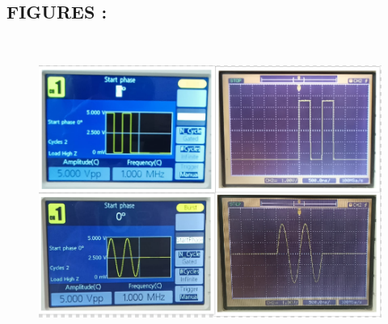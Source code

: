 \documentclass[report]{IEEEtran}
\begin{document}
\subsection{FIGURES : } \\

\begin{figure}[h]
				 \centering
				 \includegraphics[width=\columnwidth]{fig1.png}
				 \label{fig:Plot1}
			 \end{figure}
\end{document}
